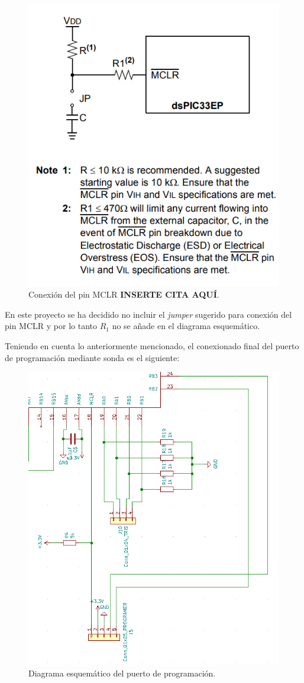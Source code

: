 \begin{itemize}
    \begin{figure}[H]
    \centering 
    \includegraphics[width=.6\linewidth]{pictures/MCLR.PNG}
    \caption{Conexión del pin MCLR \textbf{INSERTE CITA AQUÍ}.}
    \label{fig:CAMBIAR!!!!!!!!!!}
    \end{figure}
    
    En este proyecto se ha decidido no incluir el \textit{jumper} sugerido para conexión del pin MCLR y por lo tanto $R_1$ no se añade en el diagrama esquemático.
    
    Teniendo en cuenta lo anteriormente mencionado, el conexionado final del puerto de programación mediante sonda es el siguiente:
    
    \begin{figure}[H]
    \centering 
    \includegraphics[width=.5\linewidth]{pictures/sonda.PNG}
    \caption{Diagrama esquemático del puerto de programación.}
    \label{fig:CAMBIAR!!!!!!!!!!}
    \end{figure}
    

\end{itemize}
